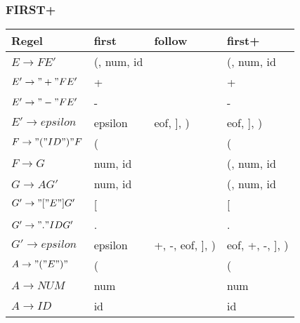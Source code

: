 \subsubsection{FIRST+}
\begin{tabular}{llll}
 Regel & first &  follow &  first+ \\
\hline
$E  \rightarrow F E'           $ & (, num, id & & (, num, id \\
$E' \rightarrow "+" F E'      $ & + & & + \\
$E' \rightarrow "-" F E'      $ & - & & - \\
$E' \rightarrow epsilon       $ & epsilon & eof, ], ) & eof, ], ) \\
$F  \rightarrow "(" ID ")" F  $ & ( & & ( \\
$F  \rightarrow G             $ & num, id & & (, num, id \\
$G  \rightarrow A G'          $ & num, id & & (, num, id \\
$G' \rightarrow "[" E "] G'   $ & [ & & [ \\
$G' \rightarrow "." ID G'     $ & . & & . \\
$G' \rightarrow epsilon       $ & epsilon & +, -, eof, ], ) & eof, +, -, ], ) \\
$A  \rightarrow "(" E ")"      $ & ( & & ( \\
$A  \rightarrow NUM            $ & num & & num \\
$A  \rightarrow ID             $ & id & &  id \\
\end{tabular}
